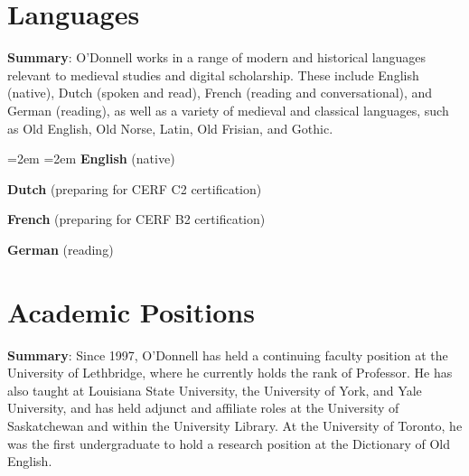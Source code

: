 \documentclass[12pt]{article}
\begin{document}
\section*{Languages}

\textbf{Summary}: O'Donnell works in a range of modern and historical languages relevant to medieval studies and digital scholarship. These include English (native), Dutch (spoken and read), French (reading and conversational), and German (reading), as well as a variety of medieval and classical languages, such as Old English, Old Norse, Latin, Old Frisian, and Gothic.


{\leftskip=2em
\hangindent=2em
\noindent
\textbf{English} (native)

\textbf{Dutch} (preparing for CERF C2 certification)

\textbf{French} (preparing for CERF B2 certification)

\textbf{German} (reading)

}

\section*{Academic Positions}

\textbf{Summary}: Since 1997, O'Donnell has held a continuing faculty position at the University of Lethbridge, where he currently holds the rank of Professor. He has also taught at Louisiana State University, the University of York, and Yale University, and has held adjunct and affiliate roles at the University of Saskatchewan and within the University Library. At the University of Toronto, he was the first undergraduate to hold a research position at the Dictionary of Old English.
\end{document}
